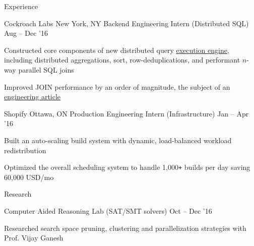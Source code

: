 \documentclass{resume} %
\begin{document}
\begin{rSection}{Experience}
  \begin{rWorkSection}{Cockroach Labs}
                     {New York, NY}
                     {Backend Engineering Intern (Distributed SQL)}
                     {Aug -- Dec '16}
    \item Constructed core components of new distributed query
      \href{https://github.com/cockroachdb/cockroach/blob/master/docs/RFCS/20160421_distributed_sql.md}
      {\underline{execution engine}}, including distributed aggregations, sort,
      row-deduplications, and performant $n$-way parallel SQL joins
    \item Improved JOIN performance by an order of magnitude, the
      subject of an
      \href{https://www.cockroachlabs.com/blog/better-sql-joins-in-cockroachdb/}
      {\underline{engineering article}}
  \end{rWorkSection}

  \begin{rWorkSection}{Shopify}
                     {Ottawa, ON}
                     {Production Engineering Intern (Infrastructure)}
                     {Jan -- Apr '16}
  \item Built an auto-scaling build system with dynamic, load-balanced
    workload redistribution
  \item Optimized the overall scheduling system to handle 1,000\texttt{+}
    builds per day saving 60,000 USD/mo
  \end{rWorkSection}
  \vspace{0.5em}
\end{rSection}


\begin{rSection}{Research}
  \begin{rResearchSection}{Computer Aided Reasoning Lab}
                     {(SAT/SMT solvers)}
                     {Oct -- Dec '16}
   \item Researched search space pruning, clustering and
     parallelization strategies with Prof. Vijay Ganesh
  \end{rResearchSection}
  \vspace{0.5em}
\end{rSection}

\end{document}
